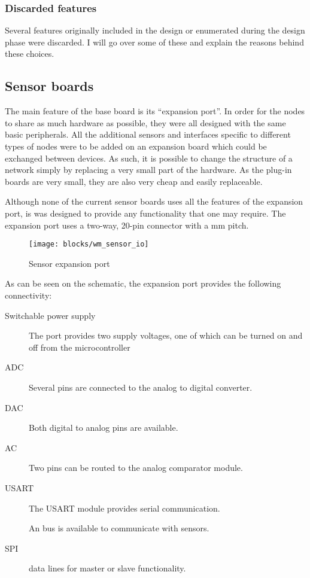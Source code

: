 \subsubsection{Discarded features}

Several features originally included in the design or enumerated during the
design phase were discarded. I will go over some of these and explain the
reasons behind these choices.


\subsection{Sensor boards}

The main feature of the base board is its ``expansion port''. In order for the
nodes to share as much hardware as possible, they were all designed with the
same basic peripherals. All the additional sensors and interfaces specific to
different types of nodes were to be added on an expansion board which could be
exchanged between devices. As such, it is possible to change the structure of a
network simply by replacing a very small part of the hardware. As the plug-in
boards are very small, they are also very cheap and easily replaceable.

Although none of the current sensor boards uses all the features of the
expansion port, is was designed to provide any functionality that one may
require. The expansion port uses a two-way, 20-pin connector with a \unit[2]{mm}
pitch.

\begin{figure}[hp]
  \begin{center}
    \texttt{[image: blocks/wm\_sensor\_io]}
  \end{center}
  \caption{Sensor expansion port}
  \label{fig:sensor-io}
\end{figure}

As can be seen on the schematic, the expansion port provides the following
connectivity:
\begin{description}
  \item [Switchable power supply] The port provides two supply voltages, one of
    which can be turned on and off from the microcontroller
  \item[ADC] Several pins are connected to the analog to digital converter.
  \item[DAC] Both digital to analog pins are available.
  \item[AC] Two pins can be routed to the analog comparator module.
  \item[USART] The USART module provides serial communication.
  \item[\IIC{}] An \IIC{} bus is available to communicate with sensors.
  \item[SPI] data lines for master or slave functionality.
\end{description}

